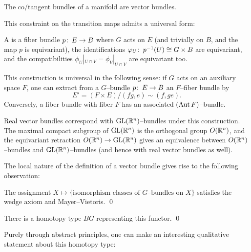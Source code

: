 \begin{example}
The co/tangent bundles of a manifold are vector bundles.
\end{example}

\noindent
This constraint on the transition maps admits a universal form:

\begin{definition}
A  is a fiber bundle $p\colon\thinspace E \to B$ where $G$ acts on $E$ (and trivially on $B$, and the map $p$ is equivariant), the identifications $\varphi_U\colon\thinspace p^{-1}(U) \cong G \times B$ are equivariant, and the compatibilities $\phi_U|_{U \cap V} = \phi_V|_{U \cap V}$ are equivariant too.
\end{definition}

\begin{remark}
This construction is universal in the following sense: if $G$ acts on an auxiliary space $F$, one can extract from a $G$--bundle $p\colon\thinspace E \to B$ an $F$--fiber bundle by \[E' = (F \times E) / (fg, e) \sim (f, ge).\]
Conversely, a fiber bundle with fiber $F$ has an associated $(\operatorname{Aut} F)$--bundle.
\end{remark}

\begin{example}
Real vector bundles correspond with $\mathrm{GL}(\mathbb R^n)$--bundles under this construction.
The maximal compact subgroup of $\mathrm{GL}(\mathbb R^n)$ is the orthogonal group $O(\mathbb R^n)$, and the equivariant retraction $O(\mathbb R^n) \to \mathrm{GL}(\mathbb R^n)$ gives an equivalence between $O(\mathbb R^n)$--bundles and $\mathrm{GL}(\mathbb R^n)$--bundles (and hence with real vector bundles as well).
\end{example}

The local nature of the definition of a vector bundle gives rise to the following observation:

\begin{lemma}
The assignment $X \mapsto \{\text{isomorphism classes of $G$--bundles on $X$}\}$ satisfies the wedge axiom and Mayer--Vietoris. \qed
\end{lemma}

\begin{corollary}
There is a homotopy type $BG$ representing this functor. \qed
\end{corollary}

\noindent
Purely through abstract principles, one can make an interesting qualitative statement about this homotopy type:

